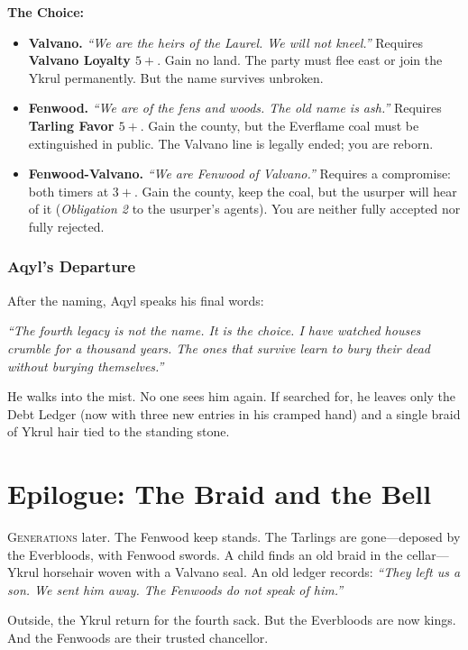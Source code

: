 \documentclass[11pt,a5paper]{book}
\newcommand{\condition}[1]{\textit{#1}}
\begin{document}
\textbf{The Choice:}
\begin{itemize}[leftmargin=*]
\item \textbf{Valvano.} \textit{``We are the heirs of the Laurel. We will not kneel.''} Requires \textbf{Valvano Loyalty $5+$}. Gain no land. The party must flee east or join the Ykrul permanently. But the name survives unbroken.
\item \textbf{Fenwood.} \textit{``We are of the fens and woods. The old name is ash.''} Requires \textbf{Tarling Favor $5+$}. Gain the county, but the Everflame coal must be extinguished in public. The Valvano line is legally ended; you are reborn.
\item \textbf{Fenwood-Valvano.} \textit{``We are Fenwood of Valvano.''} Requires a compromise: both timers at $3+$. Gain the county, keep the coal, but the usurper will hear of it (\condition{Obligation 2} to the usurper's agents). You are neither fully accepted nor fully rejected.
\end{itemize}

\subsection*{Aqyl's Departure}

After the naming, Aqyl speaks his final words:

\emph{``The fourth legacy is not the name. It is the choice. I have watched houses crumble for a thousand years. The ones that survive learn to bury their dead without burying themselves.''}

He walks into the mist. No one sees him again. If searched for, he leaves only the Debt Ledger (now with three new entries in his cramped hand) and a single braid of Ykrul hair tied to the standing stone.

\clearpage

\chapter*{Epilogue: The Braid and the Bell}

\lettrine{G}{enerations} later. The Fenwood keep stands. The Tarlings are gone---deposed by the Everbloods, with Fenwood swords. A child finds an old braid in the cellar---Ykrul horsehair woven with a Valvano seal. An old ledger records: \textit{``They left us a son. We sent him away. The Fenwoods do not speak of him.''}

Outside, the Ykrul return for the fourth sack. But the Everbloods are now kings. And the Fenwoods are their trusted chancellor.
\end{document}

